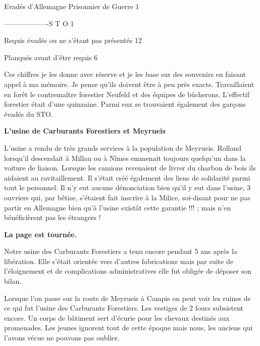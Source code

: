 \vspace{0.25cm}

Evadés d’Allemagne Prisonnier de Guerre \hfill 1

-------------------S T O \hfill 1

Requis évadés ou ne s’étant pas présentés \hfill 12

Planqués avant d’être requis \hfill 6

\vspace{0.4cm}

Ces chiffres je les donne avec réserve et je les base sur des souvenirs en faisant appel à ma
mémoire. Je pense qu’ils doivent être à peu près exacts.
Travaillaient en forêt le contremaître forestier Neufeld et des équipes de bûcherons. L’effectif
forestier était d’une quinzaine. Parmi eux se trouvaient également des garçons évadés du
STO.

\vspace{0.55cm}

\textbf{L’usine de Carburants Forestiers et Meyrueis}

\vspace{0.35cm}

L’usine a rendu de très grands services à la population de Meyrueis. Rolland lorsqu’il
descendait à Millau ou à Nîmes emmenait toujours quelqu’un dans la voiture de liaison.
Lorsque les camions revenaient de livrer du charbon de bois ils aidaient au ravitaillement. Il
s’était créé également des liens de solidarité parmi tout le personnel. Il n’y eut aucune
dénonciation bien qu’il y eut dans l’usine, 3 ouvriers qui, par bêtise, s’étaient fait inscrire à la
Milice, soi-disant pour ne pas partir en Allemagne bien qu’à l’usine existât cette garantie !!! ;
mais n’en bénéficièrent pas les étrangers !

\vspace{0.55cm}

\textbf{La page est tournée.}

\vspace{0.35cm}

Notre usine des Carburants Forestiers a tenu encore pendant 5 ans après la libération. Elle
s’était orientée vers d’autres fabrications mais par suite de l’éloignement et de complications
administratives elle fut obligée de déposer son bilan.


Lorsque l’on passe sur la route de Meyrueis à Campis on peut voir les ruines de ce qui fut
l’usine des Carburants Forestiers. Les vestiges de 2 fours subsistent encore. Un corps de
bâtiment sert d’écurie pour les chevaux destinés aux promenades. Les jeunes ignorent tout de
cette époque mais nous, les anciens qui l’avons vécue ne pouvons pas oublier.

